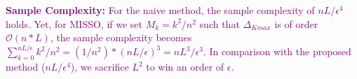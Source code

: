 \documentclass{article} %
\theoremstyle{t}
\begin{document}
\textcolor{purple}{
\textbf{Sample Complexity:} 
 For the naive method, the sample complexity of $nL/\epsilon^4$ holds.
 Yet, for MISSO, if we set $M_k = k^2/n^2$ such that $\Delta_{Kmax}$ is of order $\mathcal{O}(n*L)$, the sample complexity becomes $\sum_{k=0}^{nL/\epsilon} k^2/n^2 = (1/n^2)*(nL/\epsilon)^3 = nL^3 / \epsilon^3$.
 In comparison with the proposed method ($nL/\epsilon^4$), we sacrifice $L^2$ to win an order of $\epsilon$.
 }
\end{document}
